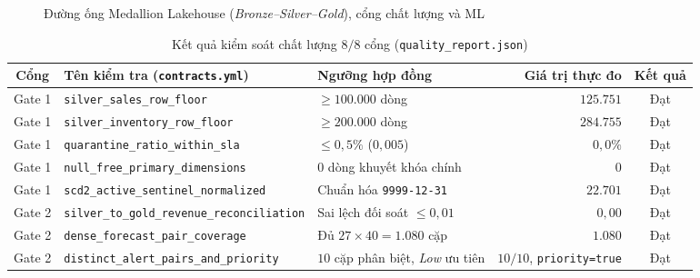 \begin{figure}[H]
	\centering
	\caption{Đường ống Medallion Lakehouse (\textit{Bronze--Silver--Gold}), cổng chất lượng và ML}
	\label{fig:medallion_lakehouse}
\end{figure}

\begin{table}[H]
	\centering
	\caption{Kết quả kiểm soát chất lượng $8/8$ cổng (\texttt{quality\_report.json})}
	\label{tab:quality-gates}
	\scriptsize
	\setlength{\tabcolsep}{3.5pt}
	\begin{tabular}{c p{5.0cm} l r c}
		\toprule
		\textbf{Cổng} & \textbf{Tên kiểm tra (\texttt{contracts.yml})}        & \textbf{Ngưỡng hợp đồng}                 & \textbf{Giá trị thực đo}                  & \textbf{Kết quả} \\
		\midrule
		Gate 1        & \texttt{silver_sales_row_floor}                       & $\ge 100.000$ dòng                       & $125.751$                                 & Đạt              \\
		Gate 1        & \texttt{silver_inventory_row_floor}                   & $\ge 200.000$ dòng                       & $284.755$                                 & Đạt              \\
		Gate 1        & \texttt{quarantine_ratio_within_sla}                  & $\le 0{,}5\%$ ($0{,}005$)                & $0{,}0\%$                                 & Đạt              \\
		Gate 1        & \texttt{null_free_primary_dimensions}                 & $0$ dòng khuyết khóa chính               & $0$                                       & Đạt              \\
		Gate 1        & \texttt{scd2_active_sentinel_normalized}              & Chuẩn hóa \texttt{9999-12-31}            & $22.701$                                  & Đạt              \\
		Gate 2        & \texttt{silver\_to\_gold\_\allowbreak{}revenue\_reconciliation} & Sai lệch đối soát $\le 0{,}01$           & $0{,}00$                                  & Đạt              \\
		Gate 2        & \texttt{dense_forecast_pair_coverage}                 & Đủ $27 \times 40 = 1.080$ cặp            & $1.080$                                   & Đạt              \\
		Gate 2        & \texttt{distinct\_alert\_pairs\_\allowbreak{}and\_priority}     & $10$ cặp phân biệt, \textit{Low} ưu tiên & $10/10$, \texttt{priority=true} & Đạt              \\
		\bottomrule
	\end{tabular}
\end{table}
